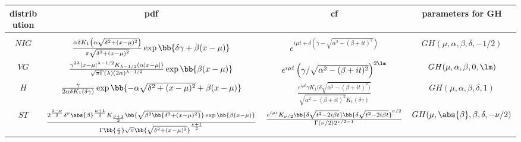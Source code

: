 \begin{center}
\begin{tabular}{cccc}
\hline
distribution & pdf & cf & parameters for GH\\ \hline
\\

\vspace{4mm}


$NIG$ & $\frac{\alpha\delta K_1 \left(\alpha\sqrt{\delta^2 + (x - \mu)^2}\right)}{\pi \sqrt{\delta^2 + (x - \mu)^2}} \exp\bb{\delta \gamma + \beta (x - \mu)}$ &  $e^{i\mu t + \delta (\gamma - \sqrt{\alpha^2 -(\beta + it)^2})}$ & $GH(\mu, \alpha,\beta, \delta,-1/2)$ \\


\vspace{4mm}

$VG$ & $\frac{\gamma^{2\lambda} | x - \mu|^{\lambda-1/2} K_{\lambda-1/2} \left(\alpha|x - \mu|\right)}{\sqrt{\pi} \Gamma (\lambda)(2 \alpha)^{\lambda-1/2}}  \exp\bb{\beta (x - \mu)}$ & $e^{i\mu t} \left(\gamma/\sqrt{\alpha^2 -(\beta+it)^2}\right)^{2\lm}$  & $GH(\mu, \alpha,\beta,0,\lm)$ \\

\vspace{4mm}

$H$ & $\frac{\gamma}{2\alpha\delta K_1(\delta \gamma)} \exp\bb{-\alpha\sqrt{\delta^2 + (x - \mu)^2}+ \beta (x - \mu)}$ & $\frac{e^{i\mu t}\gamma K_1(\delta \sqrt{ \alpha^2 -(\beta +it)^2)}}{\sqrt{\alpha^2 -(\beta + it)^2}K_1 (\delta \gamma)}$   & $GH(\mu, \alpha,\beta, \delta,1)$\\

\vspace{4mm}

$ST$ & $\frac{2^{\frac{1-\nu}2}\delta^\nu \abs{\beta}^{\frac{\nu +1}2}K_{\frac{\nu+1}2}\bb{\sqrt{\beta^2\bb{\delta^2 + (x-\mu)^2}}}\exp\bb{\beta(x-\mu)}}{\Gamma\bb{\frac{\nu}{2}}\sqrt{\pi}\bb{\sqrt{\delta^2 + (x-\mu)^2}}^{\frac{\nu+1}{2}}}$ & $\frac{ e^{i\mu t} K_{\nu/2} \bb{\delta \sqrt{t^2 - 2i\beta t}}\bb{\delta \sqrt{t^2 - 2i\beta t} }^{\nu/2}}{\Gamma(\nu/2)2^{\nu/2-1}}$ & $GH(\mu, \abs{\beta},\beta, \delta,-\nu/2)$\\


\end{tabular}
\end{center}
